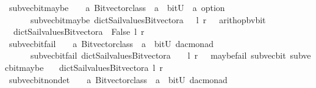 \begin{isabellebody}
\isanewline
{}\isamarkupfalse%
\ sub{\isacharunderscore}vec{\isacharunderscore}bit{\isacharunderscore}maybe\ \ {\isacharcolon}{\isacharcolon}\ {\isachardoublequoteopen}\ {\isacharprime}a\ Bitvector{\isacharunderscore}class\ {\isasymRightarrow}\ {\isacharprime}a\ {\isasymRightarrow}\ bitU\ {\isasymRightarrow}\ {\isacharprime}a\ option\ {\isachardoublequoteclose}\ \ \ \isanewline
\ \ \ \ \ {\isachardoublequoteopen}\ sub{\isacharunderscore}vec{\isacharunderscore}bit{\isacharunderscore}maybe\ dict{\isacharunderscore}Sail{}{\isacharunderscore}values{\isacharunderscore}Bitvector{\isacharunderscore}a\ \ \ l\ r\ {\isacharequal}\ {\isacharparenleft}\ arith{\isacharunderscore}op{\isacharunderscore}bv{\isacharunderscore}bit\ \isanewline
\ \ dict{\isacharunderscore}Sail{}{\isacharunderscore}values{\isacharunderscore}Bitvector{\isacharunderscore}a\ {\isacharparenleft}{\isacharminus}{\isacharparenright}\ False\ l\ r\ {\isacharparenright}{\isachardoublequoteclose}\isanewline
\isanewline
{}\isamarkupfalse%
\ sub{\isacharunderscore}vec{\isacharunderscore}bit{\isacharunderscore}fail\ \ {\isacharcolon}{\isacharcolon}\ {\isachardoublequoteopen}\ {\isacharprime}a\ Bitvector{\isacharunderscore}class\ {\isasymRightarrow}\ {\isacharprime}a\ {\isasymRightarrow}\ bitU\ {\isasymRightarrow}{\isacharparenleft}{\isacharprime}d{\isacharcomma}{\isacharprime}a{\isacharcomma}{\isacharprime}c{\isacharparenright}monad\ {\isachardoublequoteclose}\ \ \ \isanewline
\ \ \ \ \ {\isachardoublequoteopen}\ sub{\isacharunderscore}vec{\isacharunderscore}bit{\isacharunderscore}fail\ dict{\isacharunderscore}Sail{}{\isacharunderscore}values{\isacharunderscore}Bitvector{\isacharunderscore}a\ \ \ \ l\ r\ {\isacharequal}\ {\isacharparenleft}\ maybe{\isacharunderscore}fail\ {\isacharparenleft}{\isacharprime}{\isacharprime}sub{\isacharunderscore}vec{\isacharunderscore}bit{\isacharprime}{\isacharprime}{\isacharparenright}\ {\isacharparenleft}sub{\isacharunderscore}vec{\isacharunderscore}bit{\isacharunderscore}maybe\ \isanewline
\ \ dict{\isacharunderscore}Sail{}{\isacharunderscore}values{\isacharunderscore}Bitvector{\isacharunderscore}a\ l\ r{\isacharparenright}{\isacharparenright}{\isachardoublequoteclose}\isanewline
\isanewline
{}\isamarkupfalse%
\ sub{\isacharunderscore}vec{\isacharunderscore}bit{\isacharunderscore}nondet\ \ {\isacharcolon}{\isacharcolon}\ {\isachardoublequoteopen}\ {\isacharprime}a\ Bitvector{\isacharunderscore}class\ {\isasymRightarrow}\ {\isacharprime}a\ {\isasymRightarrow}\ bitU\ {\isasymRightarrow}{\isacharparenleft}{\isacharprime}d{\isacharcomma}{\isacharprime}a{\isacharcomma}{\isacharprime}c{\isacharparenright}monad\ {\isachardoublequoteclose}\ \ \ \isanewline

\end{isabellebody}
